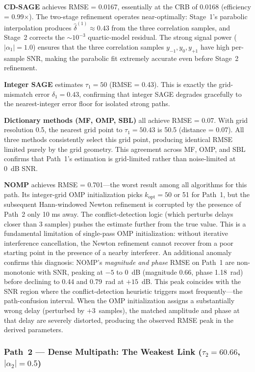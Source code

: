 \documentclass[a4paper,fleqn]{cas-dc}
\begin{document}
\textbf{CD-SAGE} achieves RMSE = 0.0167, essentially at the CRB of 0.0168 (efficiency = 0.99$\times$). The two-stage refinement operates near-optimally: Stage~1's parabolic interpolation produces $\hat{\delta}^{(1)} \approx 0.43$ from the three correlation samples, and Stage~2 corrects the $\sim 10^{-3}$ quartic-model residual. The strong signal power ($|\alpha_1|=1.0$) ensures that the three correlation samples $y_{-1}, y_0, y_{+1}$ have high per-sample SNR, making the parabolic fit extremely accurate even before Stage~2 refinement.

\textbf{Integer SAGE} estimates $\tau_1 = 50$ (RMSE = 0.43). This is exactly the grid-mismatch error $\delta_1 = 0.43$, confirming that integer SAGE degrades gracefully to the nearest-integer error floor for isolated strong paths.

\textbf{Dictionary methods (MF, OMP, SBL)} all achieve RMSE = 0.07. With grid resolution 0.5, the nearest grid point to $\tau_1 = 50.43$ is 50.5 (distance = 0.07). All three methods consistently select this grid point, producing identical RMSE limited purely by the grid geometry. This agreement across MF, OMP, and SBL confirms that Path~1's estimation is grid-limited rather than noise-limited at 0~dB SNR.

\textbf{NOMP} achieves RMSE = 0.701---the worst result among all algorithms for this path. Its integer-grid OMP initialization picks $k_{\text{opt}} = 50$ or 51 for Path~1, but the subsequent Hann-windowed Newton refinement is corrupted by the presence of Path~2 only 10 ms away. The conflict-detection logic (which perturbs delays closer than 3 samples) pushes the estimate further from the true value. This is a fundamental limitation of single-pass OMP initialization: without iterative interference cancellation, the Newton refinement cannot recover from a poor starting point in the presence of a nearby interferer. An additional anomaly confirms this diagnosis: NOMP's \textit{magnitude and phase} RMSE on Path~1 are non-monotonic with SNR, peaking at $-5$ to $0$~dB (magnitude 0.66, phase 1.18~rad) before declining to 0.44 and 0.79~rad at $+15$~dB. This peak coincides with the SNR region where the conflict-detection heuristic triggers most frequently---the path-confusion interval. When the OMP initialization assigns a substantially wrong delay (perturbed by $+3$~samples), the matched amplitude and phase at that delay are severely distorted, producing the observed RMSE peak in the derived parameters.

\subsubsection{Path~2 --- Dense Multipath: The Weakest Link ($\tau_2 = 60.66$, $|\alpha_2| = 0.5$)}
\end{document}
